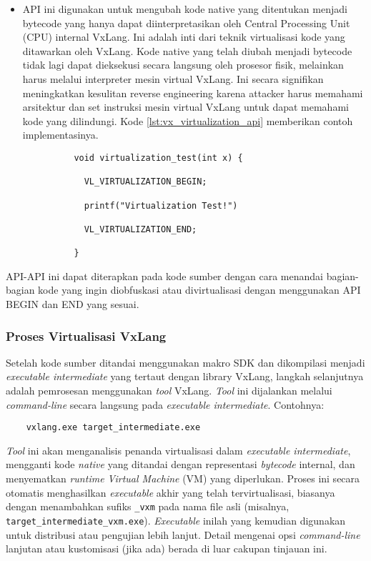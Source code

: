 \begin{itemize}
	\item {} API ini digunakan untuk mengubah kode native yang ditentukan menjadi bytecode yang hanya dapat diinterpretasikan oleh Central Processing Unit (CPU) internal VxLang. Ini adalah inti dari teknik virtualisasi kode yang ditawarkan oleh VxLang. Kode native yang telah diubah menjadi bytecode tidak lagi dapat dieksekusi secara langsung oleh prosesor fisik, melainkan harus melalui interpreter mesin virtual VxLang. Ini secara signifikan meningkatkan kesulitan reverse engineering karena attacker harus memahami arsitektur dan set instruksi mesin virtual VxLang untuk dapat memahami kode yang dilindungi. Kode \ref{lst:vx_virtualization_api} memberikan contoh implementasinya.
	      \begin{verbatim}     
          void virtualization_test(int x) {

            VL_VIRTUALIZATION_BEGIN;

            printf("Virtualization Test!")

            VL_VIRTUALIZATION_END;

          }
    \end{verbatim}
    \label{lst:vx_virtualization_api}

\end{itemize}

API-API ini dapat diterapkan pada kode sumber dengan cara menandai bagian-bagian kode yang ingin diobfuskasi atau divirtualisasi dengan menggunakan API BEGIN dan END yang sesuai.

\subsubsection{Proses Virtualisasi VxLang}
Setelah kode sumber ditandai menggunakan makro SDK dan dikompilasi menjadi \textit{executable intermediate} yang tertaut dengan library VxLang, langkah selanjutnya adalah pemrosesan menggunakan \textit{tool} VxLang. \textit{Tool} ini dijalankan melalui \textit{command-line} secara langsung pada \textit{executable intermediate}. Contohnya:
\begin{verbatim}
    vxlang.exe target_intermediate.exe
\end{verbatim}
\textit{Tool} ini akan menganalisis penanda virtualisasi dalam \textit{executable intermediate}, mengganti kode \textit{native} yang ditandai dengan representasi \textit{bytecode} internal, dan menyematkan \textit{runtime Virtual Machine} (VM) yang diperlukan. Proses ini secara otomatis menghasilkan \textit{executable} akhir yang telah tervirtualisasi, biasanya dengan menambahkan sufiks \texttt{\_vxm} pada nama file asli (misalnya, \texttt{target\_intermediate\_vxm.exe}). \textit{Executable} inilah yang kemudian digunakan untuk distribusi atau pengujian lebih lanjut. Detail mengenai opsi \textit{command-line} lanjutan atau kustomisasi (jika ada) berada di luar cakupan tinjauan ini.

